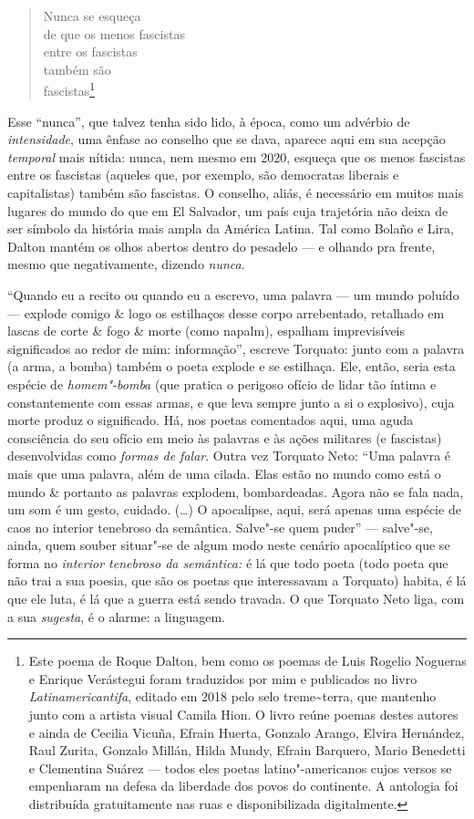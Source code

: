 \begin{verse}
Nunca se esqueça\\
de que os menos fascistas\\
entre os fascistas\\
também são\\
fascistas\footnote{Este poema de Roque Dalton, bem como os poemas de
  Luis Rogelio Nogueras e Enrique Verástegui foram traduzidos por mim e
  publicados no livro \emph{Latinamericantifa}, editado em 2018 pelo
  selo treme\textasciitilde{}terra, que mantenho junto com a artista
  visual Camila Hion. O livro reúne poemas destes autores e ainda de
  Cecilia Vicuña, Efrain Huerta, Gonzalo Arango, Elvira Hernández, Raul
  Zurita, Gonzalo Millán, Hilda Mundy, Efrain Barquero, Mario Benedetti
  e Clementina Suárez --- todos eles poetas latino"-americanos cujos versos
  se empenharam na defesa da liberdade dos povos do continente. A
  antologia foi distribuída gratuitamente nas ruas e disponibilizada
  digitalmente.}
\end{verse}

Esse ``nunca'', que talvez tenha sido lido, à época, como um advérbio de
\emph{intensidade}, uma ênfase ao conselho que se dava, aparece aqui em
sua acepção \emph{temporal} mais nítida: nunca, nem mesmo em 2020,
esqueça que os menos fascistas entre os fascistas (aqueles que, por
exemplo, são democratas liberais e capitalistas) também são fascistas. O
conselho, aliás, é necessário em muitos mais lugares do mundo do que em
El Salvador, um país cuja trajetória não deixa de ser símbolo da
história mais ampla da América Latina. Tal como Bolaño e Lira, Dalton
mantém os olhos abertos dentro do pesadelo --- e olhando pra frente, mesmo
que negativamente, dizendo \emph{nunca}.

\asterisc

``Quando eu a recito ou quando eu a escrevo, uma palavra --- um mundo
poluído --- explode comigo \& logo os estilhaços desse corpo arrebentado,
retalhado em lascas de corte \& fogo \& morte (como napalm), espalham
imprevisíveis significados ao redor de mim: informação'', escreve
Torquato: junto com a palavra (a arma, a bomba) também o poeta explode e
se estilhaça. Ele, então, seria esta espécie de \emph{homem"-bomba} (que
pratica o perigoso ofício de lidar tão íntima e constantemente com essas
armas, e que leva sempre junto a si o explosivo), cuja morte produz o
significado. Há, nos poetas comentados aqui, uma aguda consciência do
seu ofício em meio às palavras e às ações militares (e fascistas)
desenvolvidas como \emph{formas de falar}. Outra vez Torquato Neto: ``Uma
palavra é mais que uma palavra, além de uma cilada. Elas estão no mundo
como está o mundo \& portanto as palavras explodem, bombardeadas. Agora
não se fala nada, um som é um gesto, cuidado. (\ldots{}) O apocalipse, aqui,
será apenas uma espécie de caos no interior tenebroso da semântica.
Salve"-se quem puder'' --- salve"-se, ainda, quem souber situar"-se de algum
modo neste cenário apocalíptico que se forma no \emph{interior tenebroso
da semântica:} é lá que todo poeta (todo poeta que não trai a sua
poesia, que são os poetas que interessavam a Torquato) habita, é lá que
ele luta, é lá que a guerra está sendo travada. O que Torquato Neto
liga, com a sua \emph{sugesta}, é o alarme: a linguagem.

